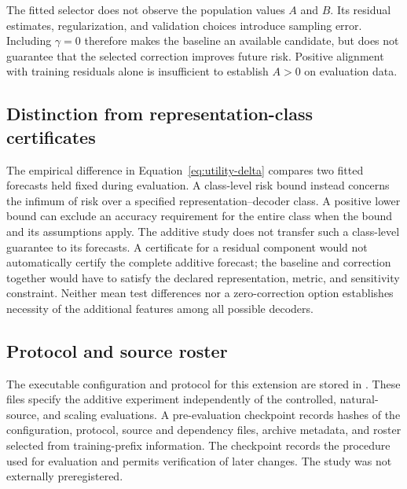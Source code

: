 The fitted selector does not observe the population values $A$ and $B$.
Its residual estimates, regularization, and validation choices introduce
sampling error. Including $\gamma=0$ therefore makes the baseline an
available candidate, but does not guarantee that the selected correction
improves future risk. Positive alignment with training residuals alone
is insufficient to establish $A>0$ on evaluation data.

\subsection{Distinction from representation-class certificates}
\label{app:utility-scope}
The empirical difference in Equation~\eqref{eq:utility-delta} compares two
fitted forecasts held fixed during evaluation. A class-level risk bound instead concerns the infimum of risk over
a specified representation--decoder class. A positive lower bound can
exclude an accuracy requirement for the entire class when the bound
and its assumptions apply. The additive study does not transfer
such a class-level guarantee to its forecasts. A certificate for a residual
component would not automatically certify the complete additive forecast;
the baseline and correction together would have to satisfy the declared
representation, metric, and sensitivity constraint. Neither mean test
differences nor a zero-correction option establishes necessity of the
additional features among all possible decoders.

\subsection{Protocol and source roster}
\label{app:utility-protocol}

The executable configuration and protocol for this extension are stored
in . These files specify the additive experiment independently of the
controlled, natural-source, and scaling evaluations. A pre-evaluation checkpoint records hashes of the configuration,
protocol, source and dependency files, archive metadata, and roster
selected from training-prefix information. The checkpoint records the procedure used for evaluation and permits
verification of later changes. The study was not externally preregistered.

